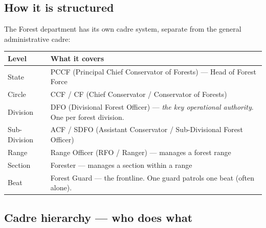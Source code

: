\documentclass[11pt,a4paper]{article}
\begin{document}
\subsection{How it is structured}

The Forest department has its own cadre system, separate from the general administrative cadre:

\begin{tabularx}{\textwidth}{@{}L{2.5cm} X@{}}
\toprule
\textbf{Level} & \textbf{What it covers} \\
\midrule
State & PCCF (Principal Chief Conservator of Forests) --- Head of Forest Force \\
Circle & CCF / CF (Chief Conservator / Conservator of Forests) \\
Division & DFO (Divisional Forest Officer) --- \textit{the key operational authority}. One per forest division. \\
Sub-Division & ACF / SDFO (Assistant Conservator / Sub-Divisional Forest Officer) \\
Range & Range Officer (RFO / Ranger) --- manages a forest range \\
Section & Forester --- manages a section within a range \\
Beat & Forest Guard --- the frontline. One guard patrols one beat (often alone). \\
\bottomrule
\end{tabularx}

\subsection{Cadre hierarchy --- who does what}
\end{document}
